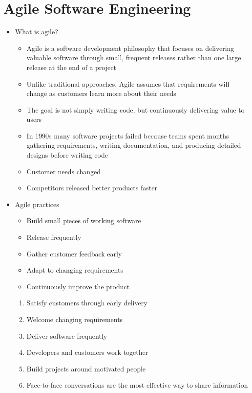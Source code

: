 \documentclass{report}
\begin{document}
\chapter{Agile Software Engineering}

	\begin{itemize}
		\item What is agile?
			\begin{itemize}
				\item Agile is a software development philosophy that focuses on delivering valuable software through small, frequent releases rather than one large release at the end of a project
				\item Unlike traditional approaches, Agile assumes that requirements will change as customers learn more about their needs
				\item The goal is not simply writing code, but continuously delivering value to users
			\end{itemize}
			\begin{itemize}
				\item In 1990s many software projects failed because teams spent months gathering requirements, writing documentation, and producing detailed designs before writing code
				\item Customer needs changed
				\item Competitors released better products faster
			\end{itemize}
		\item Agile practices
			\begin{itemize}
				\item Build small pieces of working software
				\item Release frequently
				\item Gather customer feedback early
				\item Adapt to changing requirements
				\item Continuously improve the product
			\end{itemize}
			\begin{enumerate}
				\item Satisfy customers through early delivery
				\item Welcome changing requirements
				\item Deliver software frequently
				\item Developers and customers work together
				\item Build projects around motivated people
				\item Face-to-face conversations are the most effective way to share information

\end{enumerate}
\end{itemize}
\end{document}
